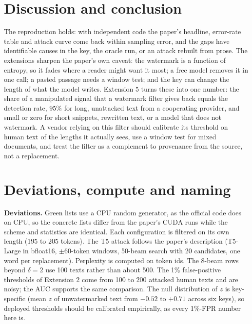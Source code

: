 \documentclass[12pt,letterpaper]{article}
\begin{document}
\section{Discussion and conclusion}

The reproduction holds: with independent code the paper's headline, error-rate table and attack curve come back within sampling error, and the gaps have identifiable causes in the key, the oracle run, or an attack rebuilt from prose. The extensions sharpen the paper's own caveat: the watermark is a function of entropy, so it fades where a reader might want it most; a free model removes it in one call; a pasted passage needs a window test; and the key can change the length of what the model writes. Extension 5 turns these into one number: the share of a manipulated signal that a watermark filter gives back equals the detection rate, 95\% for long, unattacked text from a cooperating provider, and small or zero for short snippets, rewritten text, or a model that does not watermark. A vendor relying on this filter should calibrate its threshold on human text of the lengths it actually sees, use a window test for mixed documents, and treat the filter as a complement to provenance from the source, not a replacement.

\smallskip
{}

\singlespacing
{\small

}

\appendix
\section{Deviations, compute and naming}
\label{app:map}

\small
\textbf{Deviations.} Green lists use a CPU random generator, as the official code does on CPU, so the concrete lists differ from the paper's CUDA runs while the scheme and statistics are identical. Each configuration is filtered on its own length (195 to 205 tokens). The T5 attack follows the paper's description (T5-Large in bfloat16, $\pm 60$-token windows, 50-beam search with 20 candidates, one word per replacement). Perplexity is computed on token ids. The 8-beam rows beyond $\delta = 2$ use 100 texts rather than about 500. The 1\% false-positive thresholds of Extension 2 come from 100 to 200 attacked human texts and are noisy; the AUC supports the same comparison. The null distribution of $z$ is key-specific (mean $z$ of unwatermarked text from $-0.52$ to $+0.71$ across six keys), so deployed thresholds should be calibrated empirically, as every 1\%-FPR number here is.
\end{document}
